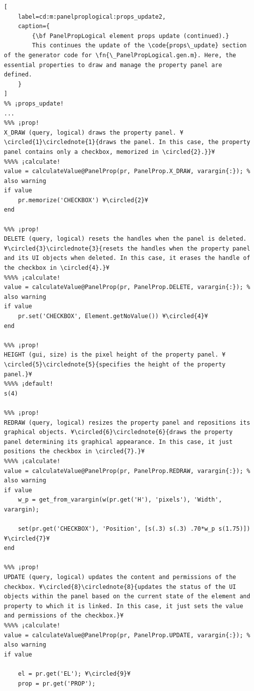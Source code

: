 \documentclass{tufte-handout}
\begin{document}
\begin{lstlisting}[
	label=cd:m:panelproplogical:props_update2,
	caption={
		{\bf PanelPropLogical element props update (continued).}
		This continues the update of the \code{props\_update} section of the generator code for \fn{\_PanelPropLogical.gen.m}. Here, the essential properties to draw and manage the property panel are defined.
	}
]
%% ¡props_update!
...
%%% ¡prop!
X_DRAW (query, logical) draws the property panel. ¥\circled{1}\circlednote{1}{draws the panel. In this case, the property panel contains only a checkbox, memorized in \circled{2}.}}¥
%%%% ¡calculate!
value = calculateValue@PanelProp(pr, PanelProp.X_DRAW, varargin{:}); % also warning
if value
	pr.memorize('CHECKBOX') ¥\circled{2}¥
end

%%% ¡prop!
DELETE (query, logical) resets the handles when the panel is deleted. ¥\circled{3}\circlednote{3}{resets the handles when the property panel and its UI objects when deleted. In this case, it erases the handle of the checkbox in \circled{4}.}¥
%%%% ¡calculate!
value = calculateValue@PanelProp(pr, PanelProp.DELETE, varargin{:}); % also warning
if value
	pr.set('CHECKBOX', Element.getNoValue()) ¥\circled{4}¥
end

%%% ¡prop!
HEIGHT (gui, size) is the pixel height of the property panel. ¥\circled{5}\circlednote{5}{specifies the height of the property panel.}¥
%%%% ¡default!
s(4)

%%% ¡prop!
REDRAW (query, logical) resizes the property panel and repositions its graphical objects. ¥\circled{6}\circlednote{6}{draws the property panel determining its graphical appearance. In this case, it just positions the checkbox in \circled{7}.}¥
%%%% ¡calculate!
value = calculateValue@PanelProp(pr, PanelProp.REDRAW, varargin{:}); % also warning
if value
	w_p = get_from_varargin(w(pr.get('H'), 'pixels'), 'Width', varargin);

	set(pr.get('CHECKBOX'), 'Position', [s(.3) s(.3) .70*w_p s(1.75)]) ¥\circled{7}¥
end

%%% ¡prop!
UPDATE (query, logical) updates the content and permissions of the checkbox. ¥\circled{8}\circlednote{8}{updates the status of the UI objects within the panel based on the current state of the element and property to which it is linked. In this case, it just sets the value and permissions of the checkbox.}¥
%%%% ¡calculate!
value = calculateValue@PanelProp(pr, PanelProp.UPDATE, varargin{:}); % also warning
if value

	el = pr.get('EL'); ¥\circled{9}¥
	prop = pr.get('PROP');


\end{lstlisting}
\end{document}
